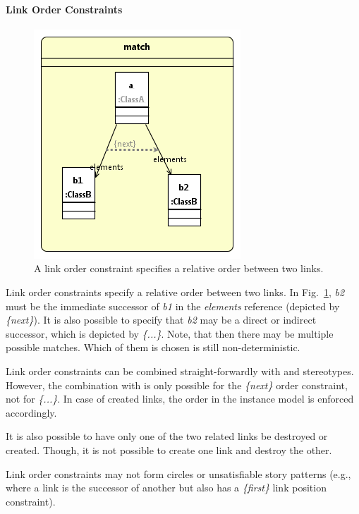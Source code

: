 {\paragraph{Link Order Constraints}

\begin{figure}[htbp]
\center
\includegraphics[width=0.4\columnwidth]{figures/linkOrderConstraint1.png}
\caption{A link order constraint specifies a relative order between two links.}
\label{fig:linkOrderConstraints:linkOrderConstaint1}
\end{figure}

Link order constraints specify a relative order between two links. In Fig.~\ref{fig:linkOrderConstraints:linkOrderConstaint1}, \emph{b2} must be the immediate successor of \emph{b1} in the \emph{elements} reference (depicted by \emph{\{next\}}). It is also possible to specify that \emph{b2} may be a direct or indirect successor, which is depicted by \emph{\{...\}}. Note, that then there may be multiple possible matches. Which of them is chosen is still non-deterministic.

Link order constraints can be combined straight-forwardly with \create and \destroy stereotypes. However, the combination with \create is only possible for the \emph{\{next\}} order constraint, not for \emph{\{...\}}. In case of created links, the order in the instance model is enforced accordingly.


It is also possible to have only one of the two related links be destroyed or created. Though, it is not possible to create one link and destroy the other.

Link order constraints may not form circles or unsatisfiable story patterns (e.g., where a link is the successor of another but also has a \emph{\{first\}} link position constraint).

}
